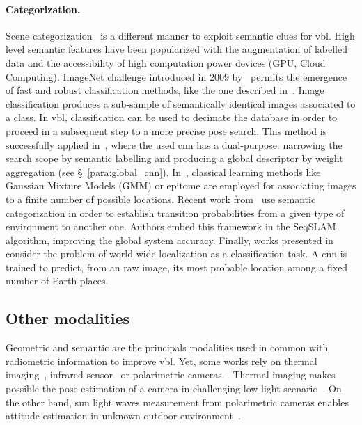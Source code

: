 		\paragraph{Categorization.}
			Scene categorization~\citep{Wu2009} is a different manner to exploit semantic clues for \ac{vbl}. High level semantic features have been popularized with the augmentation of labelled data and the accessibility of high computation power devices (GPU, Cloud Computing). ImageNet challenge introduced in 2009 by~\citep{Deng2009} permits the emergence of fast and robust classification methods, like the one described in~\citep{Krizhevsky2012}. Image classification produces a sub-sample of semantically identical images associated to a class. In \ac{vbl}, classification can be used to decimate the database in order to proceed in a subsequent step to a more precise pose search. This method is successfully applied in~\citep{Sunderhauf2015}, where the used \ac{cnn} has a dual-purpose: narrowing the search scope by semantic labelling and producing a global descriptor by weight aggregation (see \S~\ref{para:global_cnn}). In~\citep{torralba2003context,Ni2009}, classical learning methods like Gaussian Mixture Models (GMM) or epitome are employed for associating images to a finite number of possible locations. Recent work from~\citep{Garg2017} use semantic categorization in order to establish transition probabilities from a given type of environment to another one. Authors embed this framework in the SeqSLAM algorithm, improving the global system accuracy. Finally, works presented in~\citep{Weyand2016,Seo2018} consider the problem of world-wide localization as a classification task. A \ac{cnn} is trained to predict, from an raw image, its most probable location among a fixed number of Earth places.

	\subsection{Other modalities}
	\label{subsec:other_modalities}
	
	Geometric and semantic are the principals modalities used in common with radiometric information to improve \ac{vbl}. Yet, some works rely on thermal imaging~\citep{Lu2016}, infrared sensor~\citep{Bonardi2017} or polarimetric cameras~\citep{Rastgoo2018}. Thermal imaging makes possible the pose estimation of a camera in challenging low-light scenario~\citep{Lu2016}. On the other hand, sun light waves measurement from polarimetric cameras enables attitude estimation in unknown outdoor environment~\citep{Rastgoo2018}.
				
